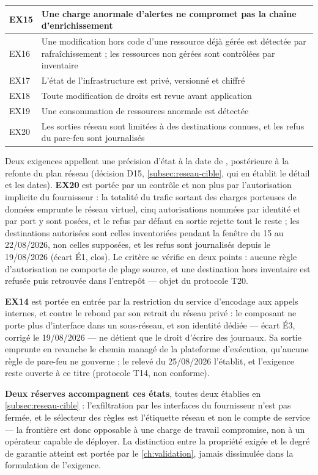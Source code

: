 {\begin{longtable}{|P{1cm}|P{14.5cm}|}
EX15 & Une charge anormale d'alertes ne compromet pas la chaîne d'enrichissement \\ \hline
EX16 & Une modification hors code d'une ressource déjà gérée est détectée par rafraîchissement ; les ressources non gérées sont contrôlées par inventaire \\ \hline
EX17 & L'état de l'infrastructure est privé, versionné et chiffré \\ \hline
EX18 & Toute modification de droits est revue avant application \\ \hline
EX19 & Une consommation de ressources anormale est détectée \\ \hline
EX20 & Les sorties réseau sont limitées à des destinations connues, et les refus du pare-feu sont journalisés \\
\hline
\end{longtable}
}

Deux exigences appellent une précision d'état à la date de \dateref{}, postérieure à la refonte du
plan réseau (décision D15, \cref{subsec:reseau-cible}, qui en établit le détail et les dates).
\textbf{EX20} est portée par un contrôle et non plus par l'autorisation implicite du fournisseur :
la totalité du trafic sortant des charges porteuses de données emprunte le réseau virtuel, cinq
autorisations nommées par identité et par port y sont posées, et le refus par défaut en sortie
rejette tout le reste ; les destinations autorisées sont celles inventoriées pendant la fenêtre du
15 au 22/08/2026, non celles supposées, et les refus sont journalisés depuis le 19/08/2026 (écart
É1, clos). Le critère se vérifie en deux points : aucune règle d'autorisation ne comporte de plage
source, et une destination hors inventaire est refusée puis retrouvée dans l'entrepôt --- objet du
protocole T20.

\textbf{EX14} est portée en entrée par la restriction du service d'encodage aux appels internes,
et contre le rebond par son retrait du réseau privé : le composant ne porte plus d'interface dans
un sous-réseau, et son identité dédiée --- écart É3, corrigé le 19/08/2026 --- ne détient que le
droit d'écrire des journaux. Sa sortie emprunte en revanche le chemin managé de la plateforme
d'exécution, qu'aucune règle de pare-feu ne gouverne ; le relevé du 25/08/2026 l'établit, et
l'exigence reste ouverte à ce titre (protocole T14, non conforme).

\textbf{Deux réserves accompagnent ces états}, toutes deux établies en
\cref{subsec:reseau-cible} : l'exfiltration par les interfaces du fournisseur n'est pas fermée, et
le sélecteur des règles est l'étiquette réseau et non le compte de service --- la frontière est
donc opposable à une charge de travail compromise, non à un opérateur capable de déployer. La
distinction entre la propriété exigée et le degré de garantie atteint est portée par le
\cref{ch:validation}, jamais dissimulée dans la formulation de l'exigence.

